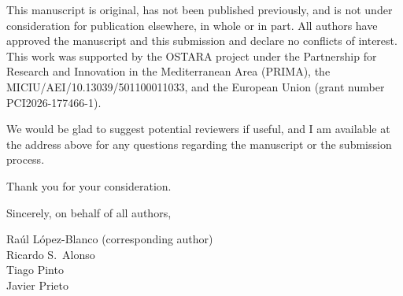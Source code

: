 \documentclass[11pt]{article}
\begin{document}
This manuscript is original, has not been published previously, and is not under consideration for publication elsewhere, in whole or in part. All authors have approved the manuscript and this submission and declare no conflicts of interest. This work was supported by the OSTARA project under the Partnership for Research and Innovation in the Mediterranean Area (PRIMA), the MICIU/AEI/10.13039/501100011033, and the European Union (grant number PCI2026-177466-1).

We would be glad to suggest potential reviewers if useful, and I am available at the address above for any questions regarding the manuscript or the submission process.

Thank you for your consideration.

\vspace{1em}
Sincerely, on behalf of all authors,

\vspace{2em}
Ra\'ul L\'opez-Blanco (corresponding author)\\
Ricardo S.~Alonso\\
Tiago Pinto\\
Javier Prieto
\end{document}
